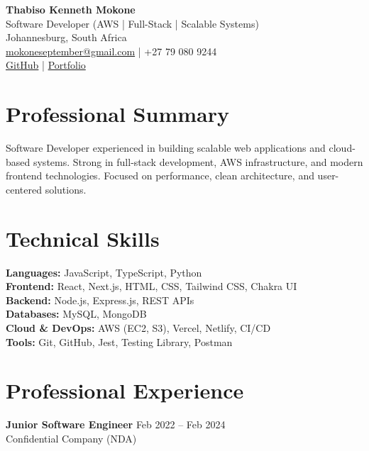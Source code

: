 \documentclass[10pt]{article}
\begin{document}
{\Huge \textbf{Thabiso Kenneth Mokone}} \\[4pt]
Software Developer (AWS | Full-Stack | Scalable Systems) \\[4pt]
Johannesburg, South Africa \\[4pt]
\href{mailto:mokoneseptember@gmail.com}{mokoneseptember@gmail.com} \;|\;
+27 79 080 9244 \\[2pt]
\href{https://github.com/mokone-september}{GitHub} \;|\;
\href{https://portfolio-ten-vert-28.vercel.app}{Portfolio}

\vspace{6pt}

\section{Professional Summary}
Software Developer experienced in building scalable web applications and cloud-based systems. 
Strong in full-stack development, AWS infrastructure, and modern frontend technologies. 
Focused on performance, clean architecture, and user-centered solutions.

\section{Technical Skills}

\textbf{Languages:} JavaScript, TypeScript, Python \\
\textbf{Frontend:} React, Next.js, HTML, CSS, Tailwind CSS, Chakra UI \\
\textbf{Backend:} Node.js, Express.js, REST APIs \\
\textbf{Databases:} MySQL, MongoDB \\
\textbf{Cloud \& DevOps:} AWS (EC2, S3), Vercel, Netlify, CI/CD \\
\textbf{Tools:} Git, GitHub, Jest, Testing Library, Postman \\

\section{Professional Experience}

\textbf{Junior Software Engineer} \hfill Feb 2022 -- Feb 2024 \\
Confidential Company (NDA)
\end{document}

